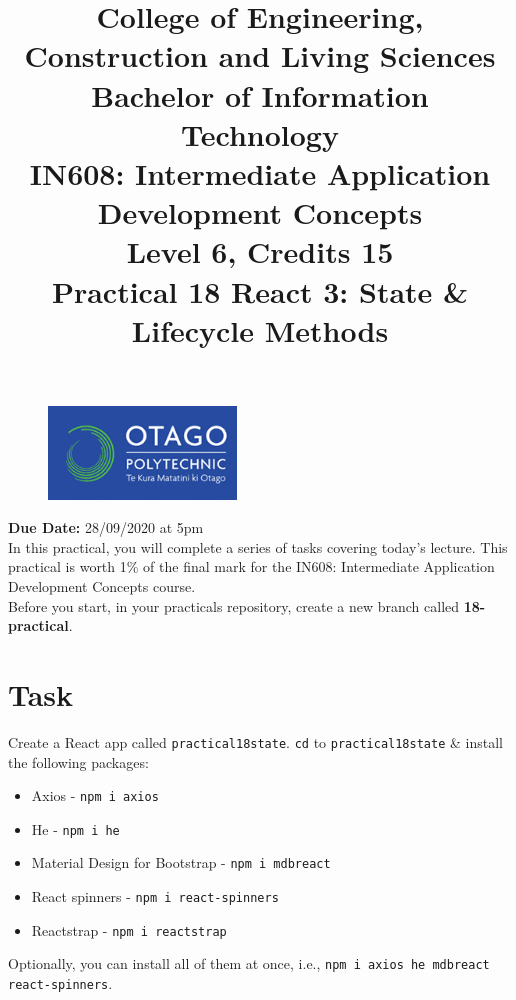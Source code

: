 \documentclass{article}
\author{}
\begin{document}
\begin{figure}
	\centering
	\includegraphics[width=50mm]{./img/logo.png}
\end{figure}

\title{College of Engineering, Construction and Living Sciences\\Bachelor of Information Technology\\IN608: Intermediate Application Development Concepts\\Level 6, Credits 15\\\textbf{Practical 18 React 3: State \& Lifecycle Methods}} 
\date{}
\maketitle

\textbf{Due Date:} 28/09/2020 at 5pm \\

In this practical, you will complete a series of tasks covering today's lecture. This practical is worth 1\% of the final mark for the IN608: Intermediate Application Development Concepts course. \\

Before you start, in your practicals repository, create a new branch called \textbf{18-practical}.

\section*{Task} 
Create a React app called \texttt{practical18state}. \texttt{cd} to \texttt{practical18state} \& install the following packages:
\begin{itemize}
  \item Axios - \texttt{npm i axios}
  \item He - \texttt{npm i he}
  \item Material Design for Bootstrap - \texttt{npm i mdbreact}
  \item React spinners - \texttt{npm i react-spinners}
  \item Reactstrap - \texttt{npm i reactstrap}
\end{itemize}

Optionally, you can install all of them at once, i.e., \texttt{npm i axios he mdbreact react-spinners}. \\
\end{document}
